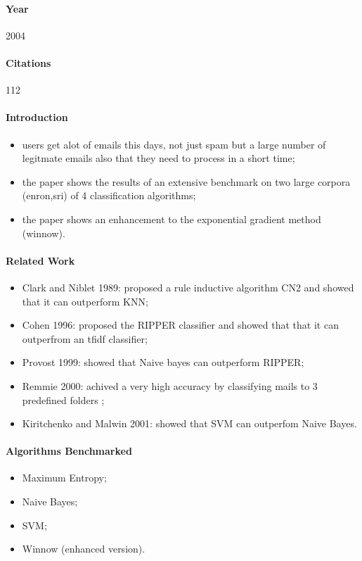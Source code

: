 \documentclass[12pt]{article}
\begin{document}
\paragraph{Year} 2004
\paragraph{Citations} 112
\paragraph{Introduction}
\begin{itemize}
  \item users get alot of emails this days, not just spam but a large number of legitmate emails also that they need to process in a short time;
  \item the paper shows the results of an extensive benchmark on two large corpora (enron,sri) of 4 classification algorithms;
  \item the paper shows an enhancement to the exponential gradient method (winnow).
\end{itemize}

\paragraph{Related Work}
\begin{itemize}
  \item Clark and Niblet 1989: proposed a rule inductive algorithm CN2 and showed that it can outperform KNN;
  \item Cohen 1996: proposed the RIPPER classifier and showed that that it can outperfrom an tfidf classifier;
  \item Provost 1999: showed that Naive bayes can outperform RIPPER;
  \item Remmie 2000: achived a very high accuracy by classifying mails to 3 predefined folders ;
  \item Kiritchenko and Malwin 2001: showed that SVM can outperfom Naive Bayes.
\end{itemize}


\paragraph{Algorithms Benchmarked}
\begin{itemize}
  \item Maximum Entropy;
  \item Naive Bayes;
  \item SVM;
  \item Winnow (enhanced version).
\end{itemize}
\end{document}
